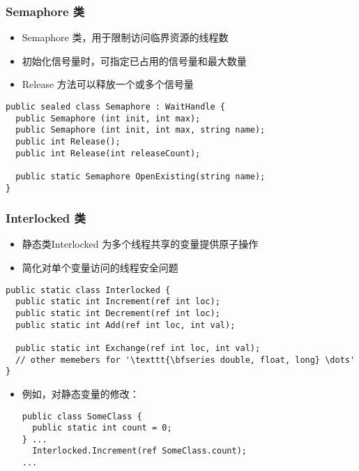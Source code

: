 \begin{frame}[fragile]
\frametitle{Semaphore 类}
\begin{itemize}
\item Semaphore 类，用于限制访问临界资源的线程数
\item 初始化信号量时，可指定已占用的信号量和最大数量
\item Release 方法可以释放一个或多个信号量
\end{itemize}
\begin{lstlisting}
public sealed class Semaphore : WaitHandle {
  public Semaphore (int init, int max);
  public Semaphore (int init, int max, string name);
  public int Release();
  public int Release(int releaseCount);

  public static Semaphore OpenExisting(string name);
}
\end{lstlisting}
\end{frame}

\begin{frame}[fragile]
\frametitle{Interlocked 类}
\begin{itemize}
\item 静态类Interlocked 为多个线程共享的变量提供原子操作
\item 简化对单个变量访问的线程安全问题
\end{itemize}
\begin{lstlisting}[escapeinside='']
public static class Interlocked {
  public static int Increment(ref int loc);
  public static int Decrement(ref int loc);
  public static int Add(ref int loc, int val);

  public static int Exchange(ref int loc, int val);
  // other memebers for '\texttt{\bfseries double, float, long} \dots' 
}
\end{lstlisting}
\begin{itemize}
\item 例如，对静态变量的修改：
\begin{lstlisting}
public class SomeClass {
  public static int count = 0;
} ...
  Interlocked.Increment(ref SomeClass.count);
...
\end{lstlisting}
\end{itemize}
\end{frame}

